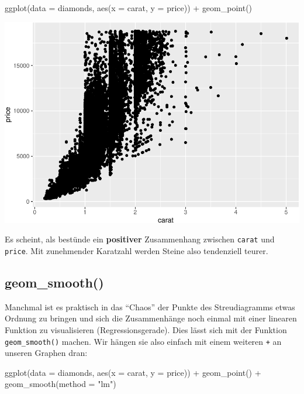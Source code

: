 \documentclass[
]{book}
\newenvironment{Shaded}{\begin{snugshade}}{\end{snugshade}}
\newcommand{\AttributeTok}[1]{\textcolor[rgb]{0.77,0.63,0.00}{#1}}
\newcommand{\FunctionTok}[1]{\textcolor[rgb]{0.00,0.00,0.00}{#1}}
\newcommand{\NormalTok}[1]{#1}
\newcommand{\SpecialCharTok}[1]{\textcolor[rgb]{0.00,0.00,0.00}{#1}}
\newcommand{\StringTok}[1]{\textcolor[rgb]{0.31,0.60,0.02}{#1}}
\begin{document}
\begin{Shaded}
\begin{Highlighting}[]
\FunctionTok{ggplot}\NormalTok{(}\AttributeTok{data =}\NormalTok{ diamonds, }\FunctionTok{aes}\NormalTok{(}\AttributeTok{x =}\NormalTok{ carat, }\AttributeTok{y =}\NormalTok{ price)) }\SpecialCharTok{+}
  \FunctionTok{geom\_point}\NormalTok{()}
\end{Highlighting}
\end{Shaded}

\includegraphics{CFH_R_bookdown_files/figure-latex/unnamed-chunk-155-1.pdf}

Es scheint, als bestünde ein \textbf{positiver} Zusammenhang zwischen \texttt{carat} und \texttt{price}. Mit zunehmender Karatzahl werden Steine also tendenziell teurer.

\hypertarget{geom_smooth}{%
\subsection{geom\_smooth()}\label{geom_smooth}}

Manchmal ist es praktisch in das ``Chaos'' der Punkte des Streudiagramms etwas Ordnung zu bringen und sich die Zusammenhänge noch einmal mit einer linearen Funktion zu visualisieren (Regressionsgerade). Dies lässt sich mit der Funktion \texttt{geom\_smooth()} machen. Wir hängen sie also einfach mit einem weiteren \texttt{+} an unseren Graphen dran:

\begin{Shaded}
\begin{Highlighting}[]
\FunctionTok{ggplot}\NormalTok{(}\AttributeTok{data =}\NormalTok{ diamonds, }\FunctionTok{aes}\NormalTok{(}\AttributeTok{x =}\NormalTok{ carat, }\AttributeTok{y =}\NormalTok{ price)) }\SpecialCharTok{+}
  \FunctionTok{geom\_point}\NormalTok{() }\SpecialCharTok{+}
  \FunctionTok{geom\_smooth}\NormalTok{(}\AttributeTok{method =} \StringTok{"lm"}\NormalTok{)}
\end{Highlighting}
\end{Shaded}
\end{document}

